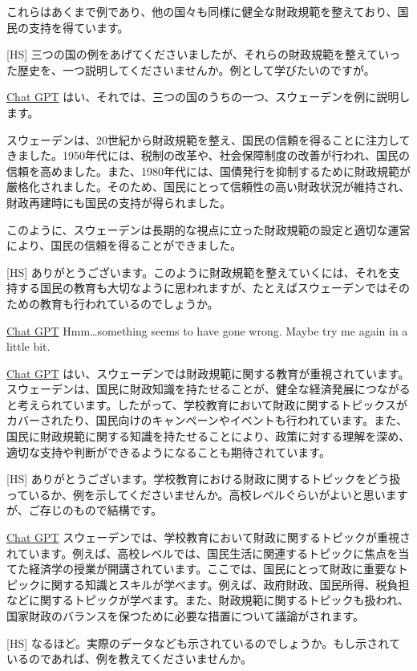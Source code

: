 \documentclass[
]{book}
\theoremstyle{definition}
\theoremstyle{definition}
\theoremstyle{definition}
\theoremstyle{definition}
\theoremstyle{remark}
\begin{document}
これらはあくまで例であり、他の国々も同様に健全な財政規範を整えており、国民の支持を得ています。

{[}HS{]} 三つの国の例をあげてくださいましたが、それらの財政規範を整えていった歴史を、一つ説明してくださいませんか。例として学びたいのですが。

\protect\hyperlink{chatgpt}{Chat GPT} はい、それでは、三つの国のうちの一つ、スウェーデンを例に説明します。

スウェーデンは、20世紀から財政規範を整え、国民の信頼を得ることに注力してきました。1950年代には、税制の改革や、社会保障制度の改善が行われ、国民の信頼を高めました。また、1980年代には、国債発行を抑制するために財政規範が厳格化されました。そのため、国民にとって信頼性の高い財政状況が維持され、財政再建時にも国民の支持が得られました。

このように、スウェーデンは長期的な視点に立った財政規範の設定と適切な運営により、国民の信頼を得ることができました。

{[}HS{]} ありがとうございます。このように財政規範を整えていくには、それを支持する国民の教育も大切なように思われますが、たとえばスウェーデンではそのための教育も行われているのでしょうか。

\protect\hyperlink{chatgpt}{Chat GPT} Hmm\ldots something seems to have gone wrong. Maybe try me again in a little bit.

\protect\hyperlink{chatgpt}{Chat GPT} はい、スウェーデンでは財政規範に関する教育が重視されています。スウェーデンは、国民に財政知識を持たせることが、健全な経済発展につながると考えられています。したがって、学校教育において財政に関するトピックスがカバーされたり、国民向けのキャンペーンやイベントも行われています。また、国民に財政規範に関する知識を持たせることにより、政策に対する理解を深め、適切な支持や判断ができるようになることも期待されています。

{[}HS{]} ありがとうございます。学校教育における財政に関するトピックをどう扱っているか、例を示してくださいませんか。高校レベルぐらいがよいと思いますが、ご存じのもので結構です。

\protect\hyperlink{chatgpt}{Chat GPT} スウェーデンでは、学校教育において財政に関するトピックが重視されています。例えば、高校レベルでは、国民生活に関連するトピックに焦点を当てた経済学の授業が開講されています。ここでは、国民にとって財政に重要なトピックに関する知識とスキルが学べます。例えば、政府財政、国民所得、税負担などに関するトピックが学べます。また、財政規範に関するトピックも扱われ、国家財政のバランスを保つために必要な措置について議論がされます。

{[}HS{]} なるほど。実際のデータなども示されているのでしょうか。もし示されているのであれば、例を教えてくださいませんか。
\end{document}
